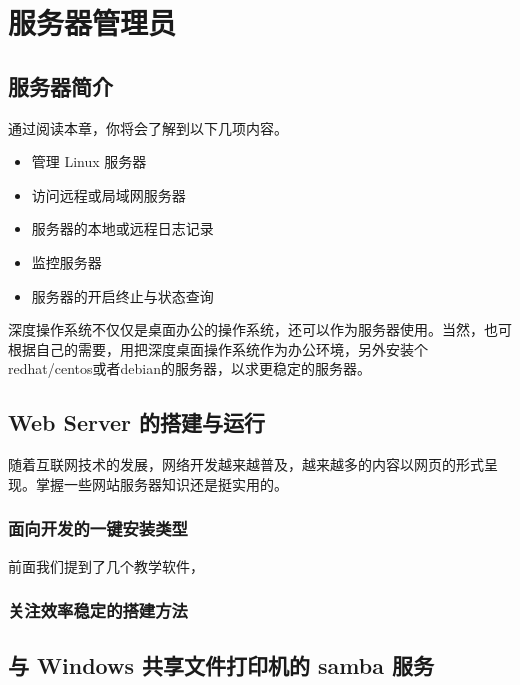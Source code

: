 \documentclass[doctor,openright,twoside]{sjtuthesis}
\newif\ifusepartquote
\newcommand{\thepartquote}{}
\newcommand{\thepartquoteauthor}{}
\newcommand{\partquote}[2]{\ifusepartquote\renewcommand{\thepartquote}{#1}\renewcommand{\thepartquoteauthor}{#2}\fi}
\newif\ifusepartintro
\newcommand{\thepartintro}{}
\newcommand{\partintro}[1]{\ifusepartintro\renewcommand{\thepartintro}{#1}\fi}
\providecommand{\tightlist}{%
    \setlength{\itemsep}{0pt}\setlength{\parskip}{0pt}}
\theoremstyle{plain}
\theoremstyle{definition}
\theoremstyle{remark}
\theoremstyle{ocrenumbox}
\theoremstyle{plain}
\begin{document}
\partquote{运筹帷幄之中，决胜千里之外}{刘邦}
\partintro{
在服务器领域，Linux 无愧于操作系统中的王者，本部分介绍几个常见服务器软件的安装使用维护的方法。
}

\hypertarget{part:server-admin}{%
\part{服务器管理员}\label{part:server-admin}}

\hypertarget{chap:server-intro}{%
\chapter{\texorpdfstring{服务器简介}{服务器简介}}\label{chap:server-intro}}

通过阅读本章，你将会了解到以下几项内容。

\begin{itemize}
\tightlist
\item
  管理 Linux 服务器
\item
  访问远程或局域网服务器
\item
  服务器的本地或远程日志记录
\item
  监控服务器
\item
  服务器的开启终止与状态查询
\end{itemize}

深度操作系统不仅仅是桌面办公的操作系统，还可以作为服务器使用。当然，也可根据自己的需要，用把深度桌面操作系统作为办公环境，另外安装个redhat/centos或者debian的服务器，以求更稳定的服务器。

\hypertarget{web-server-}{%
\chapter{Web Server 的搭建与运行}\label{web-server-}}

随着互联网技术的发展，网络开发越来越普及，越来越多的内容以网页的形式呈现。掌握一些网站服务器知识还是挺实用的。

\section{面向开发的一键安装类型}

前面我们提到了几个教学软件，

\section{关注效率稳定的搭建方法}

\hypertarget{-windows--samba-}{%
\chapter{\texorpdfstring{与 Windows 共享文件打印机的
samba
服务}{与 Windows 共享文件打印机的 samba 服务}}\label{-windows--samba-}}
\end{document}
